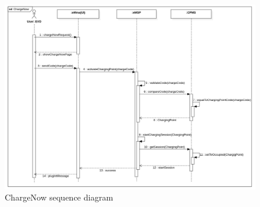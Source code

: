 \begin{figure}[H]
    \centering
    \includegraphics[width=1\textwidth]{Images/cp3/ChargeNowSD.png}
    \caption{ChargeNow sequence diagram}
\end{figure}

